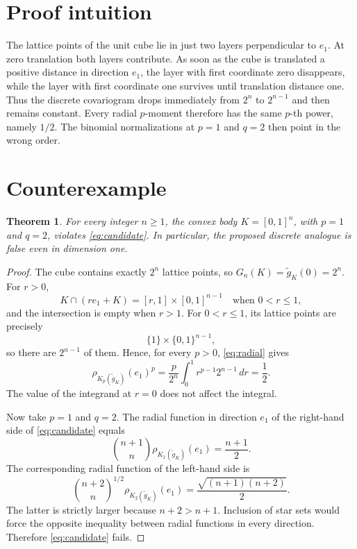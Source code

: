 \documentclass[11pt]{article}
\newtheorem{theorem}{Theorem}
\begin{document}
\section{Proof intuition}

The lattice points of the unit cube lie in just two layers perpendicular to
$e_1$.  At zero translation both layers contribute.  As soon as the cube is
translated a positive distance in direction $e_1$, the layer with first
coordinate zero disappears, while the layer with first coordinate one
survives until translation distance one.  Thus the discrete covariogram drops
immediately from $2^n$ to $2^{n-1}$ and then remains constant.  Every radial
$p$-moment therefore has the same $p$-th power, namely $1/2$.  The binomial
normalizations at $p=1$ and $q=2$ then point in the wrong order.

\section{Counterexample}

\begin{theorem}
For every integer $n\geq1$, the convex body $K=[0,1]^n$, with $p=1$ and
$q=2$, violates \eqref{eq:candidate}.  In particular, the proposed discrete
analogue is false even in dimension one.
\end{theorem}

\begin{proof}
The cube contains exactly $2^n$ lattice points, so
$G_n(K)=\widetilde g_K(0)=2^n$.  For $r>0$,
\[
 K\cap(re_1+K)=[r,1]\times[0,1]^{n-1}
 \quad\text{when }0<r\leq1,
\]
and the intersection is empty when $r>1$.  For $0<r\leq1$, its lattice
points are precisely
\[
 \{1\}\times\{0,1\}^{n-1},
\]
so there are $2^{n-1}$ of them.  Hence, for every $p>0$, \eqref{eq:radial}
gives
\begin{equation}\label{eq:half}
 \rho_{K_p(\widetilde g_K)}(e_1)^p
 =\frac{p}{2^n}\int_0^1r^{p-1}2^{n-1}\,dr
 =\frac12.
\end{equation}
The value of the integrand at $r=0$ does not affect the integral.

Now take $p=1$ and $q=2$.  The radial function in direction $e_1$ of the
right-hand side of \eqref{eq:candidate} equals
\[
 \binom{n+1}{n}\rho_{K_1(\widetilde g_K)}(e_1)
 =\frac{n+1}{2}.
\]
The corresponding radial function of the left-hand side is
\[
 \binom{n+2}{n}^{1/2}\rho_{K_2(\widetilde g_K)}(e_1)
 =\frac{\sqrt{(n+1)(n+2)}}{2}.
\]
The latter is strictly larger because $n+2>n+1$.  Inclusion of star sets
would force the opposite inequality between radial functions in every
direction.  Therefore \eqref{eq:candidate} fails.
\end{proof}
\end{document}

